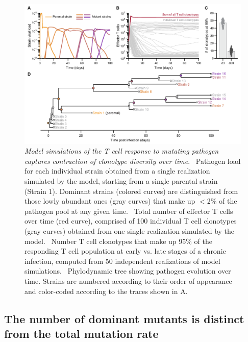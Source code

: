 \begin{figure}[t]
    \centering
    \includegraphics[width=\textwidth]{Figures/VE/fig2_timeSeries.pdf}
    \caption[Model simulations of the T cell response to mutating pathogen captures contraction of clonotype diversity over time]{\textit{Model simulations of the T cell response to mutating pathogen captures contraction of clonotype diversity over time}. %
    ~Pathogen load for each individual strain obtained from a single realization simulated by the model, starting from a single parental strain (Strain 1). Dominant strains (colored curves) are distinguished from those lowly abundant ones (gray curves) that make up $<$2\% of the pathogen pool at any given time. %
    ~Total number of effector T cells over time (red curve), comprised of 100 individual T cell clonotypes (gray curves) obtained from one single realization simulated by the model. %
    ~Number T cell clonotypes that make up 95\% of the responding T cell population at early vs. late stages of a chronic infection, computed from 50 independent realizations of model simulations. %
    ~Phylodynamic tree showing pathogen evolution over time. Strains are numbered according to their order of appearance and color-coded according to the traces shown in A. %
    }
    \label{fig:VE_timeSeries}
\end{figure}


\subsection{The number of dominant mutants is distinct from the total mutation rate}

